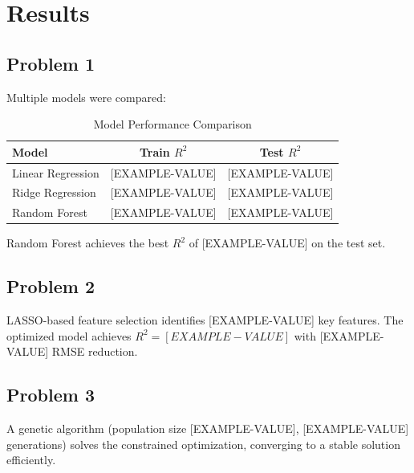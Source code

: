 \section{Results}

\subsection{Problem 1}
Multiple models were compared:

\begin{table}[htbp]
  \centering
  \caption{Model Performance Comparison}
  \begin{tabular}{lcc}
    \toprule
    \textbf{Model} & \textbf{Train $R^2$} & \textbf{Test $R^2$} \\
    \midrule
    Linear Regression & [EXAMPLE-VALUE] & [EXAMPLE-VALUE] \\
    Ridge Regression   & [EXAMPLE-VALUE] & [EXAMPLE-VALUE] \\
    Random Forest      & [EXAMPLE-VALUE] & [EXAMPLE-VALUE] \\
    \bottomrule
  \end{tabular}
\end{table}

Random Forest achieves the best $R^2$ of [EXAMPLE-VALUE] on the test set.

\subsection{Problem 2}
LASSO-based feature selection identifies [EXAMPLE-VALUE] key features. The optimized model
achieves $R^2 = [EXAMPLE-VALUE]$ with [EXAMPLE-VALUE] RMSE reduction.

\subsection{Problem 3}
A genetic algorithm (population size [EXAMPLE-VALUE], [EXAMPLE-VALUE] generations) solves the
constrained optimization, converging to a stable solution efficiently.
